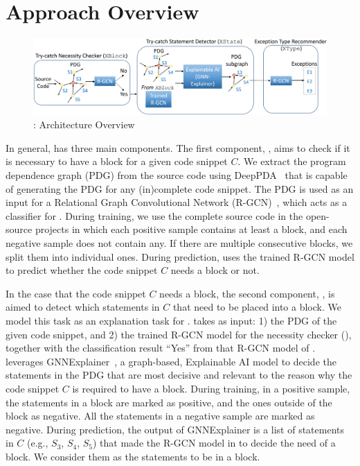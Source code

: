 \section{Approach Overview}
\label{sec:overview}

\begin{figure}[t]
\begin{center}
\includegraphics[width=5.4in]{overview-2.png}
\vspace{-10pt}
\caption{{\tool}: Architecture Overview}
\label{overview}
\end{center}
\end{figure}


In general, {\tool} has three main components. The first
component, {\xblock}, aims to check if it is necessary to have a
 block for a given code snippet $C$. We extract the
program dependence graph (PDG) from the source code using
DeepPDA~\cite{icse23} that is capable of generating the PDG for any
(in)complete code snippet. The PDG is used as an input for a
Relational Graph Convolutional Network (R-GCN)~\cite{rgcn}, which acts
as a classifier for {\xblock}. During training, we use the complete
source code in the open-source projects in which each positive sample
contains at least a  block, and each negative sample
does not contain any. If there are multiple consecutive blocks, we
split them into individual ones. During prediction, {\xblock} uses the
trained R-GCN model to predict whether the code snippet $C$ needs a
 block or not.

In the case that the code snippet $C$ needs a  block,
the second component, {\xstate}, is aimed to detect which statements
in $C$ that need to be placed into a  block.  We model
this task as an explanation task for {\xblock}. {\xstate} takes as
input: 1) the PDG of the given code snippet, and 2) the trained R-GCN
model for the  necessity checker ({\xblock}), together
with the classification result ``Yes'' from that R-GCN model of
{\xblock}. {\xstate} leverages GNNExplainer~\cite{GNNExplainer}, a
graph-based, Explainable AI model to decide the statements in the PDG
that are most decisive and relevant to the reason why the code snippet
$C$ is required to have a  block. During training, in
a positive sample, the statements in a  block are
marked as positive, and the ones outside of the block as negative. All
the statements in a negative sample are marked as negative. During
prediction, the output of GNNExplainer is a list of statements in
$C$ (e.g., $S_3$, $S_4$, $S_5$) that made the R-GCN model in {\xblock}
to decide the need of a  block. We consider them as
the statements to be in a  block.


